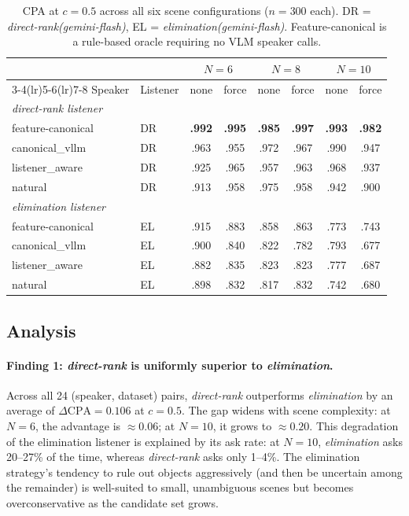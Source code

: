 \documentclass[11pt]{article}
\begin{document}
\begin{table}[ht]
\centering
\small
\setlength{\tabcolsep}{4pt}
\begin{tabular}{llcccccc}
\toprule
 & & \multicolumn{2}{c}{$N{=}6$} & \multicolumn{2}{c}{$N{=}8$} & \multicolumn{2}{c}{$N{=}10$} \\
\cmidrule(lr){3-4}\cmidrule(lr){5-6}\cmidrule(lr){7-8}
Speaker & Listener & none & force & none & force & none & force \\
\midrule
\multicolumn{8}{l}{\textit{direct-rank listener}} \\
feature-canonical    & DR & \textbf{.992} & \textbf{.995} & \textbf{.985} & \textbf{.997} & \textbf{.993} & \textbf{.982} \\
canonical\_vllm      & DR & .963 & .955 & .972 & .967 & .990 & .947 \\
listener\_aware      & DR & .925 & .965 & .957 & .963 & .968 & .937 \\
natural              & DR & .913 & .958 & .975 & .958 & .942 & .900 \\
\midrule
\multicolumn{8}{l}{\textit{elimination listener}} \\
feature-canonical    & EL & .915 & .883 & .858 & .863 & .773 & .743 \\
canonical\_vllm      & EL & .900 & .840 & .822 & .782 & .793 & .677 \\
listener\_aware      & EL & .882 & .835 & .823 & .823 & .777 & .687 \\
natural              & EL & .898 & .832 & .817 & .832 & .742 & .680 \\
\bottomrule
\end{tabular}
\caption{CPA at $c{=}0.5$ across all six scene configurations ($n{=}300$ each).
         DR = \textit{direct-rank(gemini-flash)},
         EL = \textit{elimination(gemini-flash)}.
         Feature-canonical is a rule-based oracle requiring no VLM speaker calls.}
\label{tab:fullscale}
\end{table}

\subsection{Analysis}

\paragraph{Finding 1: \textit{direct-rank} is uniformly superior to \textit{elimination}.}
Across all 24 (speaker, dataset) pairs, \textit{direct-rank} outperforms
\textit{elimination} by an average of $\Delta\text{CPA} = 0.106$ at $c{=}0.5$.
The gap widens with scene complexity: at $N{=}6$, the advantage is $\approx 0.06$;
at $N{=}10$, it grows to $\approx 0.20$.
This degradation of the elimination listener is explained by its ask rate:
at $N{=}10$, \textit{elimination} asks 20--27\% of the time, whereas
\textit{direct-rank} asks only 1--4\%.
The elimination strategy's tendency to rule out objects aggressively (and
then be uncertain among the remainder) is well-suited to small, unambiguous scenes
but becomes overconservative as the candidate set grows.
\end{document}
